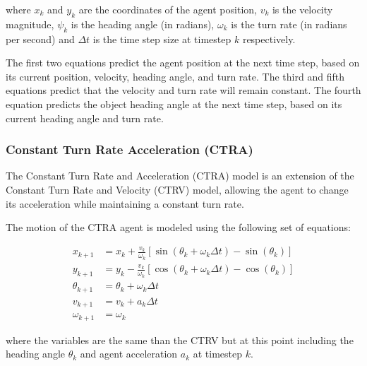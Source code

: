 where $x_k$ and $y_k$ are the coordinates of the agent position, $v_k$ is the velocity magnitude, $\psi_k$ is the heading angle (in radians), $\omega_k$ is the turn rate (in radians per second) and $\Delta t$ is the time step size at timestep $k$ respectively.

The first two equations predict the agent position at the next time step, based on its current position, velocity, heading angle, and turn rate. The third and fifth equations predict that the velocity and turn rate will remain constant. The fourth equation predicts the object heading angle at the next time step, based on its current heading angle and turn rate.

\subsubsection{Constant Turn Rate Acceleration (CTRA)}
\label{subsubsec:3_CTRA}

The Constant Turn Rate and Acceleration (CTRA) model is an extension of the Constant Turn Rate and Velocity (CTRV) model, allowing the agent to change its acceleration while maintaining a constant turn rate. %


The motion of the \ac{CTRA} agent is modeled using the following set of equations:

\begin{equation}
\begin{split}
		x_{k+1} &= x_k + \frac{v_k}{\omega_k} \left[ \sin(\theta_k + \omega_k \Delta t) - \sin(\theta_k) \right] \\
		y_{k+1} &= y_k - \frac{v_k}{\omega_k} \left[ \cos(\theta_k + \omega_k \Delta t) - \cos(\theta_k) \right] \\
		\theta_{k+1} &= \theta_k + \omega_k \Delta t \\
		v_{k+1} &= v_k + a_k \Delta t \\
		\omega_{k+1} &= \omega_k
\end{split}
\end{equation}

where the variables are the same than the \ac{CTRV} but at this point including the heading angle $\theta_k$ and agent acceleration $a_k$ at timestep $k$.

